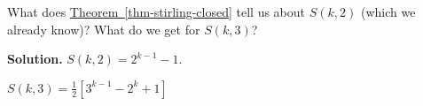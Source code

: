 \documentclass{book}
\begin{document}
\setcounter{project}{286}
\addtocounter{project}{-1}
\begin{activity}[]\label{activity-279}
\hypertarget{p-1518}{}%
What does \hyperref[thm-stirling-closed]{Theorem~\ref{thm-stirling-closed}} tell us about \(S(k, 2)\) (which we already know)?  What do we get for \(S(k,3)\)?%
\par\smallskip%
\noindent\textbf{Solution.}\hypertarget{solution-229}{}\quad%
\hypertarget{p-1519}{}%
\(S(k,2) = 2^{k-1} - 1\).%
\par
\hypertarget{p-1520}{}%
\(S(k,3) = \frac{1}{2}\left[3^{k - 1} - 2^{k} + 1 \right]\)%
\end{activity}
\end{document}

